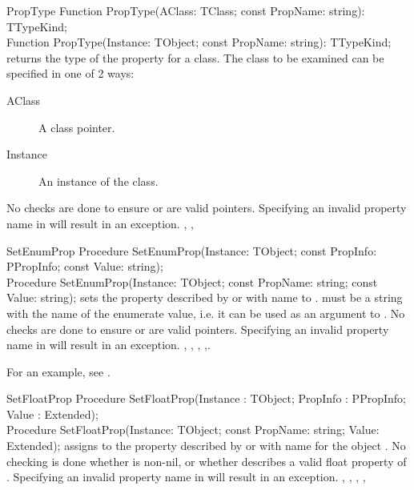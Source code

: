 \begin{function}{PropType}
\Declaration
Function PropType(AClass: TClass; const PropName: string): TTypeKind;\\
Function PropType(Instance: TObject; const PropName: string): TTypeKind;
\Description
{} returns the type of the property  for a class.
The class to be examined can be specified in one of 2 ways:
\begin{description}
\item[AClass] A class pointer. 
\item[Instance] An instance of the class.
\end{description}
\Errors
No checks are done to ensure  or  are valid
pointers. Specifying an invalid property name in  will result
in an  exception.
\SeeAlso
{}, , 
\end{function}


\begin{procedure}{SetEnumProp}
\Declaration
Procedure SetEnumProp(Instance: TObject; const PropInfo: PPropInfo;
                      const Value: string);\\
Procedure SetEnumProp(Instance: TObject; const PropName: string;
                      const Value: string);                      
\Description
{} sets the property described by  or with name
 to .  must be a string with the name
of the enumerate value, i.e. it can be used as an argument to 
.
\Errors
No checks are done to ensure  or  are valid
pointers. Specifying an invalid property name in  will result
in an  exception.                                           
\SeeAlso
{}, , ,
,.
\end{procedure}

For an example, see .

\begin{procedure}{SetFloatProp}
\Declaration
Procedure SetFloatProp(Instance : TObject;
                       PropInfo : PPropInfo;
                       Value : Extended);\\
Procedure SetFloatProp(Instance: TObject; 
                       const PropName: string; 
                       Value: Extended);
\Description
{} assigns  to the property described by
 or with name  for the object .
\Errors
No checking is done whether  is non-nil, or whether
 describes a valid float property of .
Specifying an invalid property name in  will result in an
 exception.
\SeeAlso
{}, , ,
,
\end{procedure}

